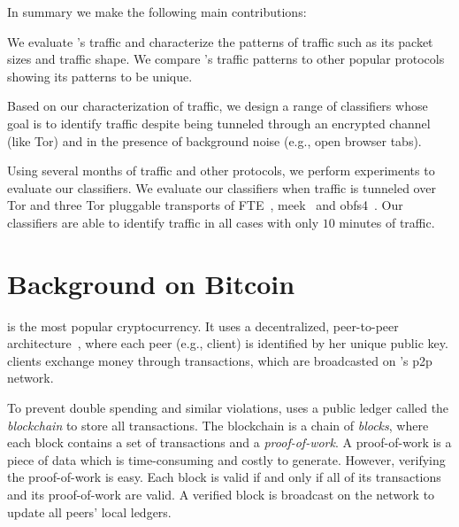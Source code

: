 
In summary we make the following main contributions:

\begin{compactenum}
	\item We evaluate \bc's traffic and characterize the patterns of \bc traffic such as its packet sizes and traffic shape. We compare \bc's traffic patterns to other popular protocols showing its patterns to be unique.  
	\item Based on our characterization of \bc traffic, we design a range of classifiers whose goal is to identify \bc traffic despite being tunneled through an encrypted channel (like Tor) and in the presence of background noise (e.g., open browser tabs). 
	\item Using several months of \bc traffic and other protocols, we perform experiments to evaluate our classifiers. We evaluate our classifiers when \bc traffic is tunneled over Tor and three Tor pluggable transports of FTE~\cite{fte}, meek~\cite{meek} and obfs4~\cite{obfsproxy}. Our classifiers are able to identify \bc traffic in all cases with only $10$ minutes of traffic.
\end{compactenum}



 \section{Background on Bitcoin}
\bc is the most popular cryptocurrency. It uses  a decentralized, peer-to-peer architecture~\cite{nakamoto2008bitcoin}, where each peer (e.g., client) is identified by her unique public key.  
	\bc clients exchange money through \bc transactions, which are  broadcasted on \bc's p2p network. 

	To prevent double spending and similar violations, \bc uses a public ledger called the \emph{blockchain} to store all \bc transactions. The blockchain is a chain of \emph{blocks}, where  each block contains a set of transactions and a \textit{proof-of-work}. A proof-of-work is a piece of data which is time-consuming and costly to generate. However, verifying the proof-of-work is easy. Each block is valid if and only if all of its transactions and its proof-of-work are valid. A verified block is broadcast on the network to update all peers' local ledgers. 
	
